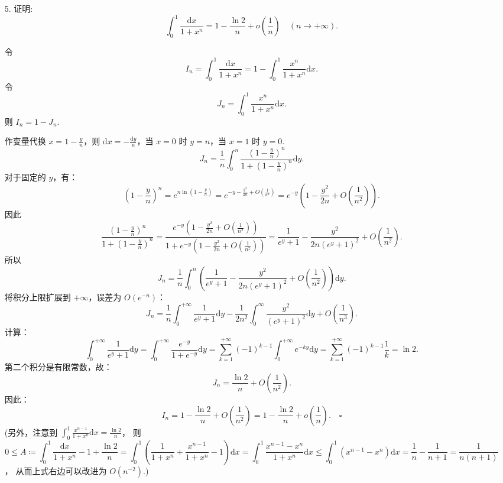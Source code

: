 \begin{enumerate}
    \item[5.]证明:
    \[\displaystyle\int_{0}^{1}\frac{\mathrm{d}x}{1 + x^{n}} = 1 - \frac{\ln 2}{n} +o\left(\frac{1}{n}\right)\quad (n\to +\infty).\]
    \begin{solution}
        令
        \[
        I_n = \int_0^1 \frac{\mathrm{d}x}{1 + x^n} = 1 - \int_0^1 \frac{x^n}{1 + x^n} \mathrm{d}x.
        \]
        令 
        \[
        J_n = \int_0^1 \frac{x^n}{1 + x^n} \mathrm{d}x.
        \]
        则 $\displaystyle I_n = 1 - J_n$.

        作变量代换 $\displaystyle x = 1 - \frac{y}{n}$，则 $\displaystyle \mathrm{d}x = -\frac{\mathrm{d}y}{n}$，当 $x=0$ 时 $y=n$，当 $x=1$ 时 $y=0$.
        \[
        J_n = \frac{1}{n} \int_0^n \frac{(1 - \frac{y}{n})^n}{1 + (1 - \frac{y}{n})^n} \mathrm{d}y.
        \]
        对于固定的 $y$，有：
        \[
        (1 - \frac{y}{n})^n = e^{n \ln(1 - \frac{y}{n})} = e^{-y - \frac{y^2}{2n} + O(\frac{1}{n^2})} = e^{-y} \left(1 - \frac{y^2}{2n} + O(\frac{1}{n^2})\right).
        \]
        因此
        \[
        \frac{(1 - \frac{y}{n})^n}{1 + (1 - \frac{y}{n})^n} = \frac{e^{-y}(1 - \frac{y^2}{2n} + O(\frac{1}{n^2}))}{1 + e^{-y}(1 - \frac{y^2}{2n} + O\left(\frac{1}{n^2}\right))}
        = \frac{1}{e^y + 1} - \frac{y^2}{2n(e^y + 1)^2} + O(\frac{1}{n^2}).
        \]
        所以
        \[
        J_n = \frac{1}{n} \int_0^n \left( \frac{1}{e^y + 1} - \frac{y^2}{2n(e^y + 1)^2} + O\left(\frac{1}{n^2}\right) \right) \mathrm{d}y.
        \]
        将积分上限扩展到 $+\infty$，误差为 $\displaystyle O(e^{-n})$：
        \[
        J_n = \frac{1}{n} \int_0^{+\infty} \frac{1}{e^y + 1} \mathrm{d}y - \frac{1}{2n^2} \int_0^\infty \frac{y^2}{(e^y + 1)^2} \mathrm{d}y + O\left(\frac{1}{n^3}\right).
        \]
        计算：
        \[
        \int_0^{+\infty} \frac{1}{e^y + 1} \mathrm{d}y = \int_0^{+\infty} \frac{e^{-y}}{1 + e^{-y}} \mathrm{d}y = \sum_{k=1}^{+\infty} (-1)^{k-1} \int_0^{+\infty} e^{-ky} \mathrm{d}y = \sum_{k=1}^{+\infty} (-1)^{k-1} \frac{1}{k} = \ln 2.
        \]
        第二个积分是有限常数，故：
        \[
        J_n = \frac{\ln 2}{n} + O\left(\frac{1}{n^2}\right).
        \]
        因此：
        \[
        I_n = 1 - \frac{\ln 2}{n} + O\left(\frac{1}{n^2}\right) = 1 - \frac{\ln 2}{n} + o\left(\frac{1}{n}\right).  \quad\square
        \]
        (另外，注意到 $\displaystyle \int_0^1 \frac{x^{n-1}}{1+x^n}\mathrm{d}x=\frac{\ln{2}}{n}$，
        则
        \[0\leq A\coloneqq \int_0^1 \frac{\mathrm{d}x}{1+x^n}-1+\frac{\ln{2}}{n}=\int_0^1\left( \frac{1}{1+x^n}+\frac{x^{n-1}}{1+x^n}-1 \right)\mathrm{d}x=\int_0^1 \frac{x^{n-1}-x^n}{1+x^n}\mathrm{d}x\leq \int_0^1\left( x^{n-1}-x^n \right)\mathrm{d}x=\frac{1}{n}-\frac{1}{n+1}=\frac{1}{n(n+1)}\]，
        从而上式右边可以改进为 $O(n^{-2})$.)
    \end{solution}
    

\end{enumerate}
